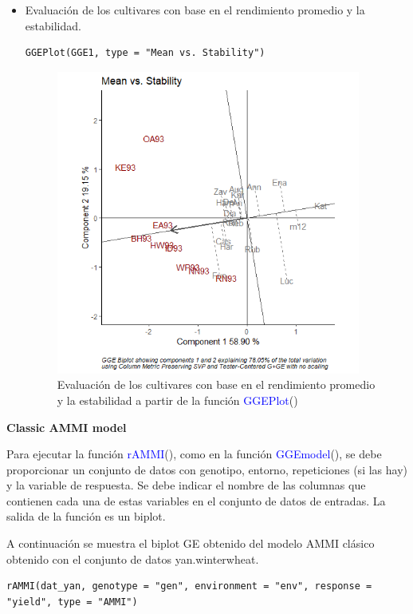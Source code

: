 \begin{itemize}
\item Evaluación de los cultivares con base en el rendimiento promedio y la estabilidad.

\begin{lstlisting}
GGEPlot(GGE1, type = "Mean vs. Stability")
\end{lstlisting}

\begin{figure}[H]
	\begin{center}
		\includegraphics[width=10cm]{./Graficos/MeanvsStability.png}
	\end{center}
	\caption{Evaluación de los cultivares con base en el rendimiento promedio y la estabilidad a partir de la función \textcolor{blue}{GGEPlot}()}
\end{figure}

\end{itemize}


\textbf{Classic AMMI model}

Para ejecutar la función \textcolor{blue}{rAMMI}(), como en la función \textcolor{blue}{GGEmodel}(), se debe proporcionar un conjunto de datos con genotipo, entorno, repeticiones (si las hay) y la variable de respuesta. Se debe indicar el nombre de las columnas que contienen cada una de estas variables en el conjunto de datos de entradas. La salida de la función es un biplot.

A continuación se muestra el biplot GE obtenido del modelo AMMI clásico obtenido con el conjunto de datos yan.winterwheat.

\begin{lstlisting}
rAMMI(dat_yan, genotype = "gen", environment = "env", response = "yield", type = "AMMI")
\end{lstlisting}

